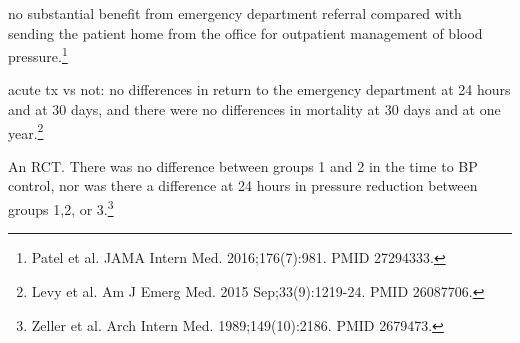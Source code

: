 \documentclass{tufte-handout}
\begin{document}
no substantial benefit from emergency department referral compared
with sending the patient home from the office for outpatient
management of blood pressure.\footnote{Patel et al. JAMA Intern Med.
  2016;176(7):981. PMID 27294333.}

acute tx vs not: no differences in return to the emergency department
at 24 hours and at 30 days, and there were no differences in mortality
at 30 days and at one year.\footnote{Levy et al. Am J Emerg Med. 2015
  Sep;33(9):1219-24. PMID 26087706.}

An RCT. There was no difference between groups 1 and 2 in the time to
BP control, nor was there a difference at 24 hours in pressure
reduction between groups 1,2, or 3.\footnote{Zeller et al. Arch Intern
  Med. 1989;149(10):2186. PMID 2679473.}
\end{document}
